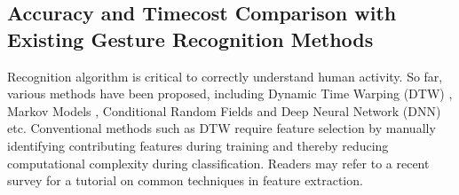 \documentclass[review]{vgtc}                 %
\begin{document}




\subsection{Accuracy and Timecost Comparison with Existing Gesture Recognition Methods}
\label{sec:compare_performance}
Recognition algorithm is critical to correctly understand human activity.
So far, various methods have been proposed, including Dynamic Time Warping (DTW) \cite{mitsa2010temporal}, 
Markov Models \cite{bulling2008robust},  Conditional Random Fields \cite{blanke2010all} and Deep Neural Network (DNN) \cite{yang2015deep} etc.
Conventional methods such as DTW require feature selection by manually identifying contributing features during training and thereby reducing computational complexity during classification.
Readers may refer to a recent survey \cite{lara2013survey} for a tutorial on common techniques in feature extraction.
\end{document}
